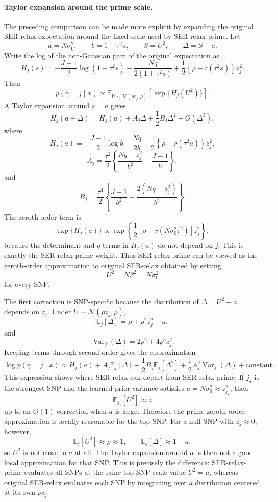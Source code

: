 \documentclass[11pt]{article}
\newcommand{\E}{\mathbb E}
\newcommand{\Var}{\operatorname{Var}}
\newcommand{\Normal}{\mathcal N}
\begin{document}
\paragraph{Taylor expansion around the prime scale.}
The preceding comparison can be made more explicit by expanding the original
SER-relax expectation around the fixed scale used by SER-relax-prime. Let
\[
a=N\sigma_0^2,\qquad b=1+\tau^2 a,\qquad S=U^2,\qquad \Delta=S-a.
\]
Write the log of the non-Gaussian part of the original expectation as
\[
H_j(s)
=
-\frac{J-1}{2}\log(1+\tau^2s)
-\frac{Nq}{2(1+\tau^2s)}
+\frac{1}{2}\left\{\rho-r(\tau^2s)\right\}z_j^2.
\]
Then
\[
p(\gamma=j\mid x)
\propto
\E_{U\sim \Normal(\rho z_j,\rho)}
\left[\exp\{H_j(U^2)\}\right].
\]
A Taylor expansion around $s=a$ gives
\[
H_j(a+\Delta)
=
H_j(a)+A_j\Delta+\frac{1}{2}B_j\Delta^2+O(\Delta^3),
\]
where
\[
H_j(a)
=
-\frac{J-1}{2}\log b
-\frac{Nq}{2b}
+\frac{1}{2}\left\{\rho-r(\tau^2a)\right\}z_j^2,
\]
\[
A_j
=
\frac{\tau^2}{2}
\left\{
\frac{Nq-z_j^2}{b^2}
-\frac{J-1}{b}
\right\},
\]
and
\[
B_j
=
\frac{\tau^4}{2}
\left\{
\frac{J-1}{b^2}
-\frac{2(Nq-z_j^2)}{b^3}
\right\}.
\]
The zeroth-order term is
\[
\exp\{H_j(a)\}
\propto
\exp\left\{
\frac{1}{2}\left[
\rho-r(N\sigma_0^2\tau^2)
\right]z_j^2
\right\},
\]
because the determinant and $q$ terms in $H_j(a)$ do not depend on $j$. This is
exactly the SER-relax-prime weight. Thus SER-relax-prime can be viewed as the
zeroth-order approximation to original SER-relax obtained by setting
\[
U^2=N\beta^2=N\sigma_0^2
\]
for every SNP.

The first correction is SNP-specific because the distribution of $\Delta=U^2-a$
depends on $z_j$. Under $U\sim \Normal(\rho z_j,\rho)$,
\[
\E_j[\Delta]
=
\rho+\rho^2z_j^2-a,
\]
and
\[
\Var_j(\Delta)
=
2\rho^2+4\rho^3z_j^2.
\]
Keeping terms through second order gives the approximation
\[
\log p(\gamma=j\mid x)
\approx
H_j(a)
+A_j\E_j[\Delta]
+\frac{1}{2}B_j\E_j[\Delta^2]
+\frac{1}{2}A_j^2\Var_j(\Delta)
+\text{constant}.
\]
This expression shows where SER-relax can depart from SER-relax-prime. If
$j_\star$ is the strongest SNP and the learned prior variance satisfies
$a=N\sigma_0^2\approx z_{j_\star}^2$, then
\[
\E_{j_\star}[U^2]\approx a
\]
up to an $O(1)$ correction when $a$ is large. Therefore the prime
zeroth-order approximation is locally reasonable for the top SNP. For a null
SNP with $z_j\approx 0$, however,
\[
\E_j[U^2]\approx \rho\approx 1,
\qquad
\E_j[\Delta]\approx 1-a,
\]
so $U^2$ is not close to $a$ at all. The Taylor expansion around $a$ is then
not a good local approximation for that SNP. This is precisely the difference:
SER-relax-prime evaluates all SNPs at the same top-SNP-scale value
$U^2=a$, whereas original SER-relax evaluates each SNP by integrating over a
distribution centered at its own $\rho z_j$.
\end{document}
